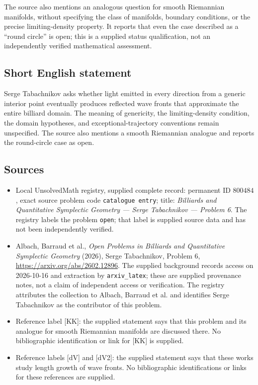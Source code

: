 \documentclass[11pt]{article}
\begin{document}
The source also mentions an analogous question for smooth Riemannian manifolds, without specifying the class of manifolds, boundary conditions, or the precise limiting-density property. It reports that even the case described as a ``round circle'' is open; this is a supplied status qualification, not an independently verified mathematical assessment.
\subsection{Short English statement}
Serge Tabachnikov asks whether light emitted in every direction from a generic interior point eventually produces reflected wave fronts that approximate the entire billiard domain. The meaning of genericity, the limiting-density condition, the domain hypotheses, and exceptional-trajectory conventions remain unspecified. The source also mentions a smooth Riemannian analogue and reports the round-circle case as open.
\subsection{Sources}
\begin{itemize}
\item Local UnsolvedMath registry, supplied complete record: permanent ID \(800484\), exact source problem code \texttt{catalogue entry}; title: \emph{Billiards and Quantitative Symplectic Geometry --- Serge Tabachnikov --- Problem 6}. The registry labels the problem \texttt{open}; that label is supplied source data and has not been independently verified.
\item Albach, Barraud et al., \emph{Open Problems in Billiards and Quantitative Symplectic Geometry} (2026), Serge Tabachnikov, Problem 6, \url{https://arxiv.org/abs/2602.12896}. The supplied background records access on 2026-10-16 and extraction by \texttt{arxiv\_latex}; these are supplied provenance notes, not a claim of independent access or verification. The registry attributes the collection to Albach, Barraud et al. and identifies Serge Tabachnikov as the contributor of this problem.
\item Reference label [KK]: the supplied statement says that this problem and its analogue for smooth Riemannian manifolds are discussed there. No bibliographic identification or link for [KK] is supplied.
\item Reference labels [dV] and [dV2]: the supplied statement says that these works study length growth of wave fronts. No bibliographic identifications or links for these references are supplied.
\end{itemize}
\end{document}
